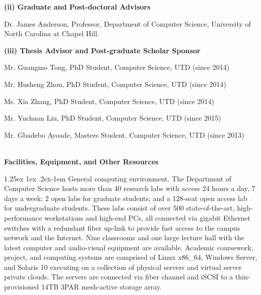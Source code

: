 \documentclass[10pt,letterpaper]{article}
\makeatletter
\renewcommand{\paragraph}{%
  \@startsection{paragraph}{4}%
  {\z@}{1.25ex \@plus 1ex \@minus .2ex}{-1em}%
  {\normalfont\normalsize\bfseries}%
}
\makeatother
\begin{document}
	\hspace{-4mm} \textbf{(ii) Graduate and Post-doctoral Advisors}\  
	\begin{changemargin}{8mm}{2mm}
	Dr. James Anderson, Professor, Department of Computer Science, University of North Carolina at Chapel Hill.
	\end{changemargin}
	
	\hspace{-4mm} \textbf{(iii) Thesis Advisor and Post-graduate Scholar Sponsor}\  
	\begin{changemargin}{8mm}{2mm}

	Mr. Guangmo Tong, PhD Student, Computer Science, UTD (since 2014)
		
	Mr. Husheng Zhou, PhD Student, Computer Science, UTD (since 2014)	
	
	Ms. Xia Zhang, PhD Student, Computer Science, UTD (since 2014)	
	
	Mr. Yuchuan Liu, PhD Student, Computer Science, UTD (since 2015)

	Mr. Gbadebo Ayoade, Masters Student, Computer Science, UTD (since 2013)	

	\end{changemargin}


\newpage


\newpage


\begin{center}
\Large{\textbf{\\Facilities, Equipment, and Other Resources}}
\end{center}

\paragraph{General computing environment.} The Department of Computer Science hosts more than 40 research labs with access 24 hours a day, 7 days a week; 2 open labs for graduate students; and a 128-seat open access lab for undergraduate students. These labs consist of over 500 state-of-the-art, high-performance workstations and high-end PCs, all connected via gigabit Ethernet switches with a redundant fiber up-link to provide fast access to the campus network and the Internet. Nine classrooms and one large lecture hall with the latest computer and audio-visual equipment are available. Academic coursework, project, and computing systems are comprised of Linux x86\_64, Windows Server, and Solaris 10 executing on a collection of physical servers and virtual server private clouds. The servers are connected via fiber channel and iSCSI to a thin-provisioned 14TB 3PAR mesh-active storage array. 
\end{document}
